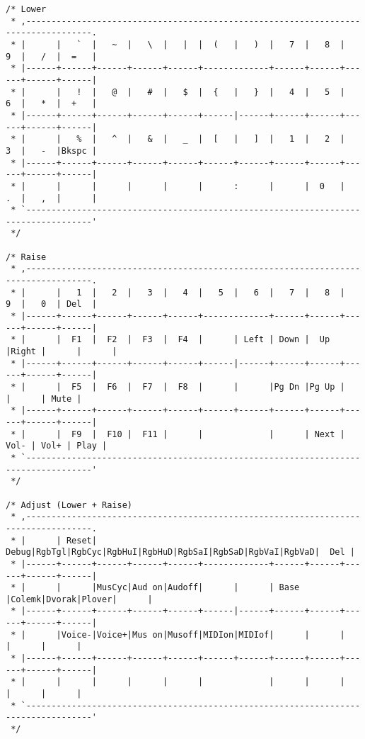\documentclass[12pt,a4paper]{report}
\begin{document}
\begin{verbatim}
/* Lower
 * ,-----------------------------------------------------------------------------------.
 * |      |   `  |   ~  |   \  |   |  |  (   |   )  |   7  |   8  |   9  |   /  |  =   |
 * |------+------+------+------+------+-------------+------+------+------+------+------|
 * |      |   !  |   @  |   #  |   $  |  {   |   }  |   4  |   5  |   6  |   *  |  +   |
 * |------+------+------+------+------+------|------+------+------+------+------+------|
 * |      |   %  |   ^  |   &  |   _  |  [   |   ]  |   1  |   2  |   3  |   -  |Bkspc |
 * |------+------+------+------+------+------+------+------+------+------+------+------|
 * |      |      |      |      |      |      :      |      |  0   |   .  |   ,  |      |
 * `-----------------------------------------------------------------------------------'
 */

/* Raise
 * ,-----------------------------------------------------------------------------------.
 * |      |   1  |   2  |   3  |   4  |   5  |   6  |   7  |   8  |   9  |   0  | Del  |
 * |------+------+------+------+------+-------------+------+------+------+------+------|
 * |      |  F1  |  F2  |  F3  |  F4  |      | Left | Down |  Up  |Right |      |      |
 * |------+------+------+------+------+------|------+------+------+------+------+------|
 * |      |  F5  |  F6  |  F7  |  F8  |      |      |Pg Dn |Pg Up |      |      | Mute |
 * |------+------+------+------+------+------+------+------+------+------+------+------|
 * |      |  F9  |  F10 |  F11 |      |             |      | Next | Vol- | Vol+ | Play |
 * `-----------------------------------------------------------------------------------'
 */

/* Adjust (Lower + Raise)
 * ,-----------------------------------------------------------------------------------.
 * |      | Reset| Debug|RgbTgl|RgbCyc|RgbHuI|RgbHuD|RgbSaI|RgbSaD|RgbVaI|RgbVaD|  Del |
 * |------+------+------+------+------+-------------+------+------+------+------+------|
 * |      |      |MusCyc|Aud on|Audoff|      |      | Base |Colemk|Dvorak|Plover|      |
 * |------+------+------+------+------+------|------+------+------+------+------+------|
 * |      |Voice-|Voice+|Mus on|Musoff|MIDIon|MIDIof|      |      |      |      |      |
 * |------+------+------+------+------+------+------+------+------+------+------+------|
 * |      |      |      |      |      |             |      |      |      |      |      |
 * `-----------------------------------------------------------------------------------'
 */
\end{verbatim}
\end{document}
